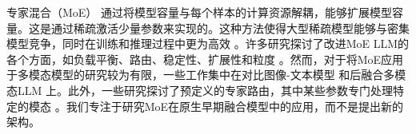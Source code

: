  专家混合（MoE） \citep{shazeer2017outrageously} 通过将模型容量与每个样本的计算资源解耦，能够扩展模型容量。这是通过稀疏激活少量参数来实现的。这种方法使得大型稀疏模型能够与密集模型竞争，同时在训练和推理过程中更为高效 \citep{fedus2022switch,sun2024hunyuan,jiang2024mixtral,liu2024deepseekv3,wei2024skywork}。许多研究探讨了改进MoE LLM的各个方面，如负载平衡、路由、稳定性、扩展性和粒度 \citep{lewis2021base,zoph2022st,lepikhin2020gshard}。然而，对于将MoE应用于多模态模型的研究较为有限，一些工作集中在对比图像-文本模型 \citep{mustafa2022multimodal} 和后融合多模态LLM \citep{lin2024moe,li2024aria} 上。此外，一些研究探讨了预定义的专家路由，其中某些参数专门处理特定的模态 \citep{bao2021vlmo,chen2024eve,shen2023scaling}。我们专注于研究MoE在原生早期融合模型中的应用，而不是提出新的架构。


